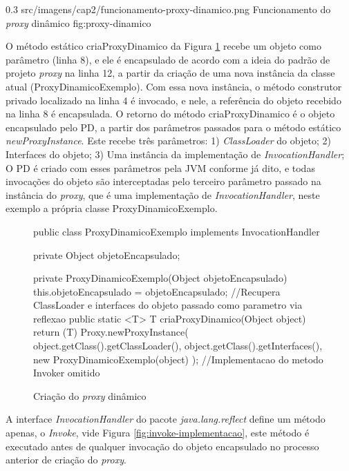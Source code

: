 \begin{image}
{0.3} %
{src/imagens/cap2/funcionamento-proxy-dinamico.png} %
{Funcionamento do \textit{proxy} dinâmico} %
{fig:proxy-dinamico} %
{\cite{guerra2014componentes}} %
\end{image}

\par O método estático criaProxyDinamico da Figura \ref{fig:cria-proxy-dinamico} recebe um objeto como parâmetro (linha 8), e ele é encapsulado de acordo com a ideia do padrão de projeto \textit{proxy} na linha 12, a partir da criação de uma nova instância da classe atual (ProxyDinamicoExemplo). Com essa nova instância, o método construtor privado localizado na linha 4 é invocado, e nele, a referência do objeto recebido na linha 8 é encapsulada. O retorno do método criaProxyDinamico é o objeto encapsulado pelo PD, a partir dos parâmetros passados para o método estático \textit{newProxyInstance}. Este recebe três parâmetros: 1) \textit{ClassLoader} do objeto; 2) Interfaces do objeto; 3) Uma instância da implementação de \textit{InvocationHandler}; O PD é criado com esses parâmetros pela JVM conforme já dito, e todas invocações do objeto são interceptadas pelo terceiro parâmetro passado na instância do \textit{proxy}, que é uma implementação de \textit{InvocationHandler}, neste exemplo a própria classe ProxyDinamicoExemplo.

\begin{figure}[H]
    \centering
    \caption{Criação do \textit{proxy} dinâmico}
    \label{fig:cria-proxy-dinamico}
    \begin{java}
public class ProxyDinamicoExemplo implements InvocationHandler {
    	private Object objetoEncapsulado;

	private ProxyDinamicoExemplo(Object objetoEncapsulado) {
		this.objetoEncapsulado = objetoEncapsulado;
	}
//Recupera ClassLoader e interfaces do objeto passado como parametro via reflexao
	public static <T> T criaProxyDinamico(Object object) {
		return (T) Proxy.newProxyInstance(
        		object.getClass().getClassLoader(),
        		object.getClass().getInterfaces(),
        		new ProxyDinamicoExemplo(object)
		);
	}
//Implementacao do metodo Invoker omitido
}
    \end{java}
\end{figure}


\par A interface \textit{InvocationHandler} do pacote \textit{java.lang.reflect} define um método apenas, o \textit{Invoke}, vide Figura \ref{fig:invoke-implementacao}, este método é executado antes de qualquer invocação do objeto encapsulado no processo anterior de criação do \textit{proxy}.

